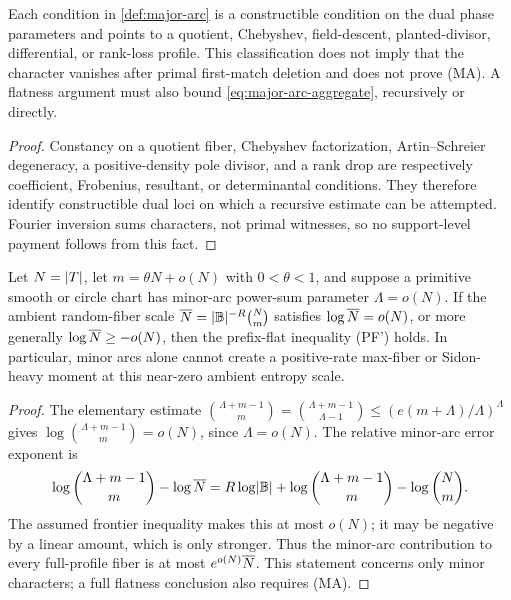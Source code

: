 \documentclass[11pt,a4paper]{amsart}
\numberwithin{equation}{section}
\theoremstyle{remark}
\begin{document}
\begin{proposition}\label{prop:major-arcs-are-cells}
Each condition in \cref{def:major-arc} is a constructible condition on the
dual phase parameters and points to a quotient, Chebyshev, field-descent,
planted-divisor, differential, or rank-loss profile.  This classification
does not imply that the character vanishes after primal first-match
deletion and does not prove \textup{(MA)}.  A flatness argument must also
bound \eqref{eq:major-arc-aggregate}, recursively or directly.
\end{proposition}

\begin{proof}
Constancy on a quotient fiber, Chebyshev factorization,
Artin--Schreier degeneracy, a positive-density pole divisor, and a rank
drop are respectively coefficient, Frobenius, resultant, or determinantal
conditions.  They therefore identify constructible dual loci on which a
recursive estimate can be attempted.  Fourier inversion sums characters,
not primal witnesses, so no support-level payment follows from this fact.
\end{proof}

\begin{proposition}\label{prop:frontier-weil-separation}
Let \(N=\lvert T\rvert\), let \(m=\theta N+o(N)\) with \(0<\theta<1\), and suppose a primitive smooth or circle chart has minor-arc power-sum parameter \(\Lambda=o(N)\).  If the ambient random-fiber scale \(\overline N=\lvert \mathbb B\rvert^{-R}\binom Nm\) satisfies \(\log\overline N=o(N)\), or more generally \(\log\overline N\ge -o(N)\), then the prefix-flat inequality \textup{(PF')} holds.  In particular, minor arcs alone cannot create a positive-rate max-fiber or Sidon-heavy moment at this near-zero ambient entropy scale.
\end{proposition}

\begin{proof}
The elementary estimate \(\binom{\Lambda+m-1}{m}=\binom{\Lambda+m-1}{\Lambda-1}\le (e(m+\Lambda)/\Lambda)^{\Lambda}\) gives \(\log\binom{\Lambda+m-1}{m}=o(N)\), since \(\Lambda=o(N)\).  The relative minor-arc error exponent is
\[
        \log\binom{\Lambda+m-1}{m}-\log\overline N
        =R\log\lvert \mathbb B\rvert+\log\binom{\Lambda+m-1}{m}-\log\binom Nm.
\]
The assumed frontier inequality makes this at most \(o(N)\); it may be
negative by a linear amount, which is only stronger.  Thus the minor-arc
contribution to every full-profile fiber is at most
\(e^{o(N)}\overline N\).  This statement concerns only minor characters; a
full flatness conclusion also requires \textup{(MA)}.
\end{proof}
\end{document}
